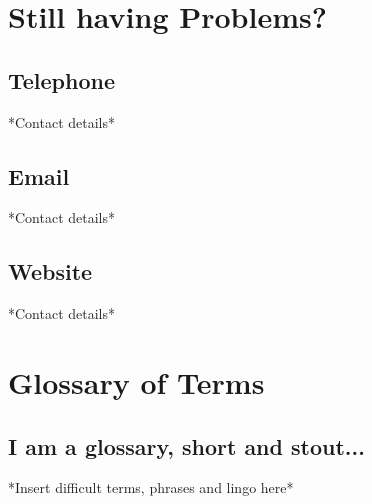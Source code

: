 \documentclass[11pt,fleqn]{book} %
\begin{document}

\chapter{Still having Problems?}
	\section{Telephone}
		*Contact details*
	\section{Email}
		*Contact details*
	\section{Website}
		*Contact details*



\chapter{Glossary of Terms}
	\section{I am a glossary, short and stout...}
		*Insert difficult terms, phrases and lingo here*
\end{document}
